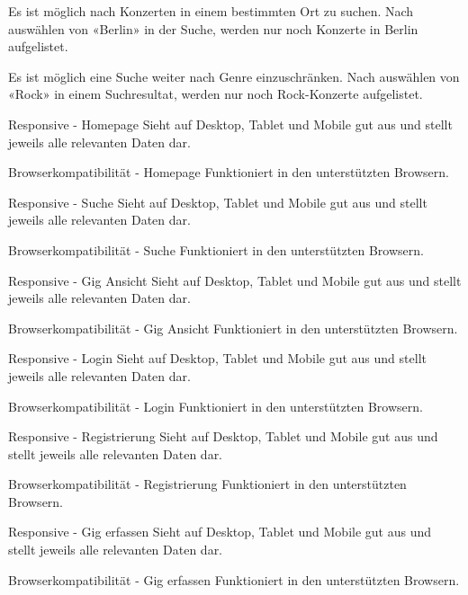 \acceptancetest
{Es ist möglich nach Konzerten in einem bestimmten Ort zu suchen.}
{Nach auswählen von «Berlin» in der Suche, werden nur noch Konzerte in Berlin aufgelistet.}

\acceptancetest
{Es ist möglich eine Suche weiter nach Genre einzuschränken.}
{Nach auswählen von «Rock» in einem Suchresultat, werden nur noch Rock-Konzerte aufgelistet.}

\clearpage

\acceptancetest
{Responsive - Homepage}
{Sieht auf Desktop, Tablet und Mobile gut aus und stellt jeweils alle relevanten Daten dar.}

\acceptancetest
{Browserkompatibilität - Homepage}
{Funktioniert in den unterstützten Browsern.}

\clearpage

\acceptancetest
{Responsive - Suche}
{Sieht auf Desktop, Tablet und Mobile gut aus und stellt jeweils alle relevanten Daten dar.}

\acceptancetest
{Browserkompatibilität - Suche}
{Funktioniert in den unterstützten Browsern.}

\clearpage

\acceptancetest
{Responsive - Gig Ansicht}
{Sieht auf Desktop, Tablet und Mobile gut aus und stellt jeweils alle relevanten Daten dar.}

\acceptancetest
{Browserkompatibilität - Gig Ansicht}
{Funktioniert in den unterstützten Browsern.}

\clearpage

\acceptancetest
{Responsive - Login}
{Sieht auf Desktop, Tablet und Mobile gut aus und stellt jeweils alle relevanten Daten dar.}

\acceptancetest
{Browserkompatibilität - Login}
{Funktioniert in den unterstützten Browsern.}

\clearpage

\acceptancetest
{Responsive - Registrierung}
{Sieht auf Desktop, Tablet und Mobile gut aus und stellt jeweils alle relevanten Daten dar.}

\acceptancetest
{Browserkompatibilität - Registrierung}
{Funktioniert in den unterstützten Browsern.}

\clearpage

\acceptancetest
{Responsive - Gig erfassen}
{Sieht auf Desktop, Tablet und Mobile gut aus und stellt jeweils alle relevanten Daten dar.}

\acceptancetest
{Browserkompatibilität - Gig erfassen}
{Funktioniert in den unterstützten Browsern.}


